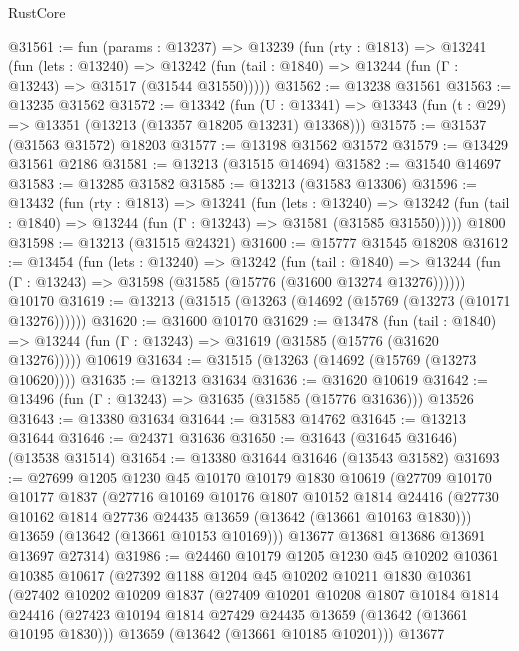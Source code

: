 \begin{lexlean}{RustCore}
\begin{coremodule}
@31561 := fun (params : @13237) =>
  @13239
    (fun (rty : @1813) =>
    @13241
      (fun (lets : @13240) =>
      @13242 (fun (tail : @1840) => @13244 (fun (Γ : @13243) => @31517 (@31544 @31550)))))
@31562 := @13238 @31561
@31563 := @13235 @31562
@31572 := @13342
    (fun (U : @13341) => @13343 (fun (t : @29) => @13351 (@13213 (@13357 @18205 @13231) @13368)))
@31575 := @31537 (@31563 @31572) @18203
@31577 := @13198 @31562 @31572
@31579 := @13429 @31561 @2186
@31581 := @13213 (@31515 @14694)
@31582 := @31540 @14697
@31583 := @13285 @31582
@31585 := @13213 (@31583 @13306)
@31596 := @13432
    (fun (rty : @1813) =>
    @13241
      (fun (lets : @13240) =>
      @13242 (fun (tail : @1840) => @13244 (fun (Γ : @13243) => @31581 (@31585 @31550)))))
    @1800
@31598 := @13213 (@31515 @24321)
@31600 := @15777 @31545 @18208
@31612 := @13454
    (fun (lets : @13240) =>
    @13242
      (fun (tail : @1840) =>
      @13244 (fun (Γ : @13243) => @31598 (@31585 (@15776 (@31600 @13274 @13276))))))
    @10170
@31619 := @13213 (@31515 (@13263 (@14692 (@15769 (@13273 (@10171 @13276))))))
@31620 := @31600 @10170
@31629 := @13478
    (fun (tail : @1840) => @13244 (fun (Γ : @13243) => @31619 (@31585 (@15776 (@31620 @13276)))))
    @10619
@31634 := @31515 (@13263 (@14692 (@15769 (@13273 @10620))))
@31635 := @13213 @31634
@31636 := @31620 @10619
@31642 := @13496 (fun (Γ : @13243) => @31635 (@31585 (@15776 @31636))) @13526
@31643 := @13380 @31634
@31644 := @31583 @14762
@31645 := @13213 @31644
@31646 := @24371 @31636
@31650 := @31643 (@31645 @31646) (@13538 @31514)
@31654 := @13380 @31644 @31646 (@13543 @31582)
@31693 := @27699
    @1205
    @1230
    @45
    @10170
    @10179
    @1830
    @10619
    (@27709
      @10170
      @10177
      @1837
      (@27716
        @10169
        @10176
        @1807
        @10152
        @1814
        @24416
        (@27730 @10162 @1814 @27736 @24435 @13659 (@13642 (@13661 @10163 @1830)))
        @13659
        (@13642 (@13661 @10153 @10169)))
      @13677
      @13681
      @13686
      @13691
      @13697
      @27314)
@31986 := @24460
    @10179
    @1205
    @1230
    @45
    @10202
    @10361
    @10385
    @10617
    (@27392
      @1188
      @1204
      @45
      @10202
      @10211
      @1830
      @10361
      (@27402
        @10202
        @10209
        @1837
        (@27409
          @10201
          @10208
          @1807
          @10184
          @1814
          @24416
          (@27423 @10194 @1814 @27429 @24435 @13659 (@13642 (@13661 @10195 @1830)))
          @13659
          (@13642 (@13661 @10185 @10201)))
        @13677

\end{coremodule}
\end{lexlean}
